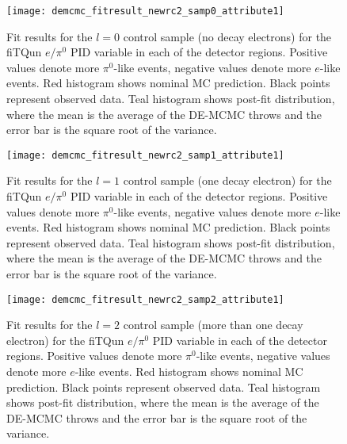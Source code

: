 \begin{figure}[h]
  \begin{center}
    \texttt{[image: demcmc\_fitresult\_newrc2\_samp0\_attribute1]} 
  \end{center}
  \caption{Fit results for the $l=0$ control sample (no decay electrons) for
  the fiTQun $e/\pi^{0}$ PID variable in each of the detector regions. Positive
  values denote more $\pi^{0}$-like events, negative values denote more
  $e$-like events. Red histogram shows nominal MC prediction.  Black points
  represent observed data.  Teal histogram shows post-fit distribution, where
  the mean is the average of the DE-MCMC throws and the error bar is the square
  root of the variance.}
  \label{fig:fitresults_samp0_att1}
\end{figure}


\begin{figure}[h]
  \begin{center}
    \texttt{[image: demcmc\_fitresult\_newrc2\_samp1\_attribute1]} 
  \end{center}
  \caption{Fit results for the $l=1$ control sample (one decay electron) for
  the fiTQun $e/\pi^{0}$ PID variable in each of the detector regions. Positive
  values denote more $\pi^{0}$-like events, negative values denote more
  $e$-like events. Red histogram shows nominal MC prediction.  Black points
  represent observed data.  Teal histogram shows post-fit distribution, where
  the mean is the average of the DE-MCMC throws and the error bar is the square
  root of the variance.}
  \label{fig:fitresults_samp1_att1}
\end{figure}


\begin{figure}[h]
  \begin{center}
    \texttt{[image: demcmc\_fitresult\_newrc2\_samp2\_attribute1]} 
  \end{center}
  \caption{Fit results for the $l=2$ control sample (more than one decay
  electron) for the fiTQun $e/\pi^{0}$ PID variable in each of the detector
  regions.  Positive values denote more $\pi^{0}$-like events, negative values
  denote more $e$-like events. Red histogram shows nominal MC prediction.
  Black points represent observed data.  Teal histogram shows post-fit
  distribution, where the mean is the average of the DE-MCMC throws and the
  error bar is the square root of the variance.}
  \label{fig:fitresults_samp2_att1}
\end{figure}



